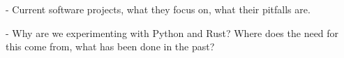 - Current software projects, what they focus on, what their pitfalls are.

- Why are we experimenting with Python and Rust? Where does the need for this come from, what has been done in the past?

